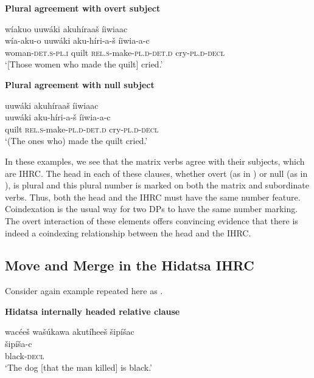 \documentclass[output=paper]{LSP/langsci}
\begin{document}
\ea \textbf{Plural agreement with overt subject} \label{boyle28}

\glll w\'iakuo uuw\'aki akuh\'iraa\v{s} \'iiwiaac\\
w\'ia-aku-o  uuw\'aki aku-h\'iri-a-\v{s}    \'iiwia-a-c\\
woman-\textsc{det.s-pl.i}  quilt  \textsc{rel.s}-make-\textsc{pl.d-det.d} cry-\textsc{pl.d-decl}\\
\trans `[Those women who made the quilt] cried.'
\z

\ea \textbf{Plural agreement with null subject} \label{boyle29}

\glll uuw\'aki akuh\'iraa\v{s} \'iiwiaac\\
uuw\'aki aku-h\'iri-a-\v{s}   \'iiwia-a-c\\
quilt     \textsc{rel.s}-make-\textsc{pl.d}-\textsc{det.d} cry-\textsc{pl.d-decl}\\
\trans `(The ones who) made the quilt cried.'	
\z

In these examples, we see that the matrix verbs agree with their subjects, which are IHRC. The head in each of these clauses, whether overt (as in ) or null (as in ), is plural and this plural number is marked on both the matrix and subordinate verbs. Thus, both the head and the IHRC must have the same number feature. Coindexation is the usual way for two DPs to have the same number marking. The overt interaction of these elements offers convincing evidence that there is indeed a coindexing relationship between the head and the IHRC.  
	
\subsection{Move and Merge in the Hidatsa IHRC} 

Consider again example  repeated here as .

\ea \textbf{Hidatsa internally headed relative clause} \label{boyle30}

\glll {\ob}wac\'ee\v{s} wa\v{s}\'ukawa akut\'ihee\v{s}{\cb} \v{s}ip\'i\v{s}ac\\
[wac\'ee-\v{s} wa\v{s}\'uka-wa aku-t\'i-hee-\v{s}] \v{s}ip\'i\v{s}a-c\\
[man-\textsc{det.d} dog-\textsc{det.i}  \textsc{rel.s}-die-\textsc{3.caus.d.sg-det.d}] black-\textsc{decl}\\
\trans `The dog [that the man killed] is black.' 
\z
\end{document}
